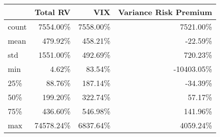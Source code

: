 \begin{tabular}{lrrr}
\toprule
{} &  Total RV &      VIX &  Variance Risk Premium \\
\midrule
count &  7554.00\% & 7558.00\% &               7521.00\% \\
mean  &   479.92\% &  458.21\% &                -22.59\% \\
std   &  1551.00\% &  492.69\% &                720.23\% \\
min   &     4.62\% &   83.54\% &             -10403.05\% \\
25\%   &    88.76\% &  187.14\% &                -34.39\% \\
50\%   &   199.20\% &  322.74\% &                 57.17\% \\
75\%   &   436.60\% &  546.98\% &                141.96\% \\
max   & 74578.24\% & 6837.64\% &               4059.24\% \\
\bottomrule
\end{tabular}

